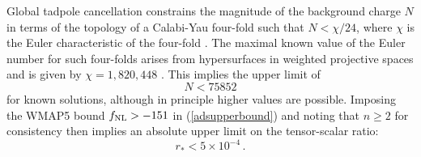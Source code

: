 Global tadpole cancellation constrains the magnitude of
the background charge $N$ in terms of the topology of 
a Calabi-Yau four-fold such that $N < \chi /
24$, where $\chi$ is the Euler characteristic of the four-fold
\cite{witten1,witten2,witten3,sethi,gkp,klemm}. 
The  maximal known value of the Euler number for such four-folds arises from 
hypersurfaces in weighted projective spaces and is given by 
$\chi = 1, 820,448$ \cite{klemm}. This implies the upper limit of 
\begin{equation}
\label{Nlimit} 
N < 75852
\end{equation}
for known solutions, although in principle higher values are possible. 
Imposing the WMAP5 bound $f_{\mathrm{NL}}>-151$ in (\ref{adsupperbound})
and noting that $n \ge 2$ for consistency then implies an absolute
upper limit 
on the tensor-scalar ratio: 
\begin{equation}
\label{absupperlimit}
r_* < 5 \times 10^{-4} \, .
\end{equation}

